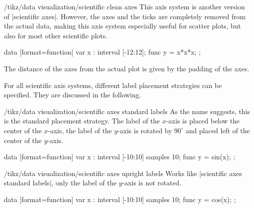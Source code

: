\begin{key}{/tikz/data visualization/scientific clean axes}
  This axis system is another version of |scientific axes|. However, the
  axes and the ticks are completely removed from the actual data,
  making this axis system especially useful for scatter plots, but
  also for most other scientific plots.

\begin{codeexample}[width=7.5cm]
\tikz {}
data [format=function] {
  var x : interval [-12:12];
  func y = \value x*\value x*\value x;
};
\end{codeexample}

  The distance of the axes from the actual plot is given by the
  padding of the axes.
\end{key}


For all scientific axis systems, different label placement strategies
can be specified. They are discussed in the following.


\begin{key}{/tikz/data visualization/scientific axes standard labels}
  As the name suggests, this is the standard placement strategy. The
  label of the $x$-axis is placed below the center of the $x$-axis,
  the label of the $y$-axis is rotated by $90^\circ$ and placed left
  of the center of the $y$-axis.
\begin{codeexample}[width=8cm]
\tikz \datavisualization
 [scientific clean axes,
  visualize as smooth line,
  scientific axes standard labels,
  x axis={label=degree $d$,
    ticks={tick unit={}^\circ}},
  y axis={label=$\sin d$}]
data [format=function] {
  var x : interval [-10:10] samples 10;
  func y = sin(\value x);
};
\end{codeexample}
\end{key}

\begin{key}{/tikz/data visualization/scientific axes upright labels}
  Works like |scientific axes standard labels|, only the label of the
  $y$-axis is not rotated.
\begin{codeexample}[width=8cm]
\tikz \datavisualization [
  scientific clean axes,
  visualize as smooth line,
  scientific axes upright labels,
  x axis={label=degree $d$,
    ticks={tick unit={}^\circ}},
  y axis={label=$\cos d$, include value=1,
    ticks={style={
        /pgf/number format/precision=4,
        /pgf/number format/fixed zerofill}}}]
data [format=function] {
  var x : interval [-10:10] samples 10;
  func y = cos(\value x);
};
\end{codeexample}
\end{key}


